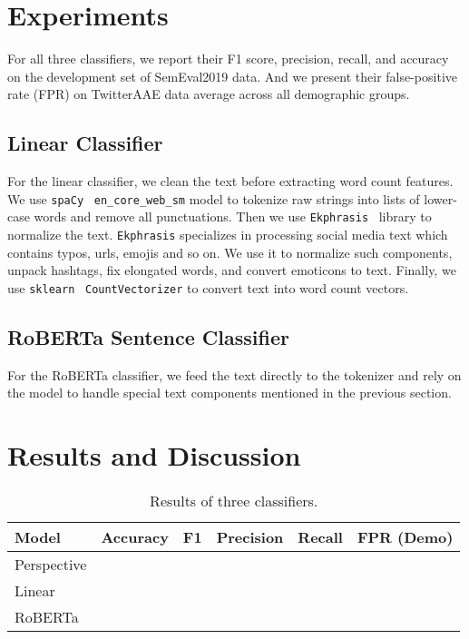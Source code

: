\documentclass[11pt]{article}
\begin{document}
    \section{Experiments}

    For all three classifiers, we report their F1 score, precision, recall, and accuracy on the development set of
    SemEval2019 data.
    And we present their false-positive rate (FPR) on TwitterAAE data average across all demographic groups.

    \subsection{Linear Classifier}

    For the linear classifier, we clean the text before extracting word count features.
    We use \texttt{spaCy}~\cite{spacy} \texttt{en\_core\_web\_sm} model to tokenize raw strings into
    lists of lower-case words and remove all punctuations.
    Then we use \texttt{Ekphrasis}~\cite{ekphrasis} library to normalize the text.
    \texttt{Ekphrasis} specializes in processing social media text which contains typos, urls, emojis and so on.
    We use it to normalize such components, unpack hashtags, fix elongated words, and convert emoticons to text.
    Finally, we use \texttt{sklearn}~\cite{scikit-learn} \texttt{CountVectorizer} to convert text into word count
    vectors.

    \subsection{RoBERTa Sentence Classifier}

    For the RoBERTa classifier, we feed the text directly to the tokenizer and rely on the model to handle special
    text components mentioned in the previous section.


    \section{Results and Discussion}

    \begin{table*}
        \small
        \centering
        \begin{tabular}{lccccc}
            \hline
            Model       & Accuracy & F1 & Precision & Recall & FPR (Demo) \\
            \hline
            Perspective &          &    &           &        &            \\\hline
            Linear      &          &    &           &        &            \\\hline
            RoBERTa     &          &    &           &        &            \\\hline
        \end{tabular}

        \caption{Results of three classifiers.}
        \label{tab:results}
    \end{table*}
\end{document}
